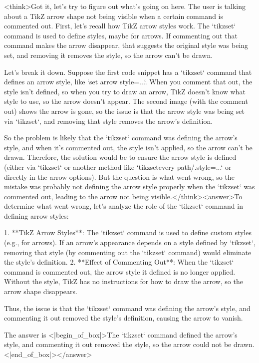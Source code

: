 <think>Got it, let's try to figure out what's going on here. The user is talking about a TikZ arrow shape not being visible when a certain command is commented out. First, let's recall how TikZ arrow styles work. The `tikzset` command is used to define styles, maybe for arrows. If commenting out that command makes the arrow disappear, that suggests the original style was being set, and removing it removes the style, so the arrow can't be drawn.

Let's break it down. Suppose the first code snippet has a `tikzset` command that defines an arrow style, like `set arrow style={...}`. When you comment that out, the style isn't defined, so when you try to draw an arrow, TikZ doesn't know what style to use, so the arrow doesn't appear. The second image (with the comment out) shows the arrow is gone, so the issue is that the arrow style was being set via `tikzset`, and removing that style removes the arrow's definition.

So the problem is likely that the `tikzset` command was defining the arrow's style, and when it's commented out, the style isn't applied, so the arrow can't be drawn. Therefore, the solution would be to ensure the arrow style is defined (either via `tikzset` or another method like `tikzset{every path/.style={...}}` or directly in the arrow options). But the question is what went wrong, so the mistake was probably not defining the arrow style properly when the `tikzset` was commented out, leading to the arrow not being visible.</think><answer>To determine what went wrong, let’s analyze the role of the `tikzset` command in defining arrow styles:  

1. **TikZ Arrow Styles**: The `tikzset` command is used to define custom styles (e.g., for arrows). If an arrow’s appearance depends on a style defined by `tikzset`, removing that style (by commenting out the `tikzset` command) would eliminate the style’s definition.  
2. **Effect of Commenting Out**: When the `tikzset` command is commented out, the arrow style it defined is no longer applied. Without the style, TikZ has no instructions for how to draw the arrow, so the arrow shape disappears.  

Thus, the issue is that the `tikzset` command was defining the arrow’s style, and commenting it out removed the style’s definition, causing the arrow to vanish.  

The answer is <|begin_of_box|>The `tikzset` command defined the arrow’s style, and commenting it out removed the style, so the arrow could not be drawn.<|end_of_box|></answer>